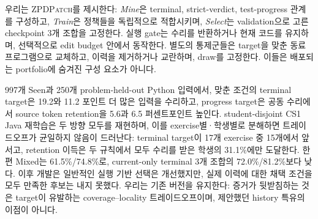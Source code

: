 \documentclass[10pt,conference]{IEEEtran}
\begin{document}
우리는 \textsc{ZPDPatch}를 제시한다: \emph{Mine}은 terminal, strict-verdict, test-progress 관계를 구성하고, \emph{Train}은 정책들을 독립적으로 적합시키며, \emph{Select}는 validation으로 고른 checkpoint 3개 조합을 고정한다. 실행 gate는 수리를 반환하거나 현재 코드를 유지하며, 선택적으로 edit budget 안에서 동작한다. 별도의 통제군들은 target을 맞춘 동료 프로그램으로 교체하고, 이력을 제거하거나 교란하며, draw를 고정한다. 이들은 배포되는 portfolio에 숨겨진 구성 요소가 아니다.

997개 Seen과 250개 problem-held-out Python 입력에서, 맞춘 조건의 terminal target은 19.2와 11.2 포인트 더 많은 입력을 수리하고, progress target은 공동 수리에서 source token retention을 5.6과 6.5 퍼센트포인트 높인다. student-disjoint CS1 Java 재학습은 두 방향 모두를 재현하며, 이를 exercise별·학생별로 분해하면 트레이드오프가 균일하지 않음이 드러난다: terminal target이 17개 exercise 중 15개에서 앞서고, retention 이득은 두 규칙에서 모두 수리를 받은 학생의 31.1\%에만 도달한다. 한편 Mixed는 61.5\%/74.8\%로, current-only terminal 3개 조합의 72.0\%/81.2\%보다 낮다. 이후 개발은 일반적인 실행 기반 선택은 개선했지만, 실제 이력에 대한 채택 조건을 모두 만족한 후보는 내지 못했다. 우리는 기존 버전을 유지한다: 증거가 뒷받침하는 것은 target이 유발하는 coverage--locality 트레이드오프이며, 제안했던 history 특유의 이점이 아니다.
\end{document}
